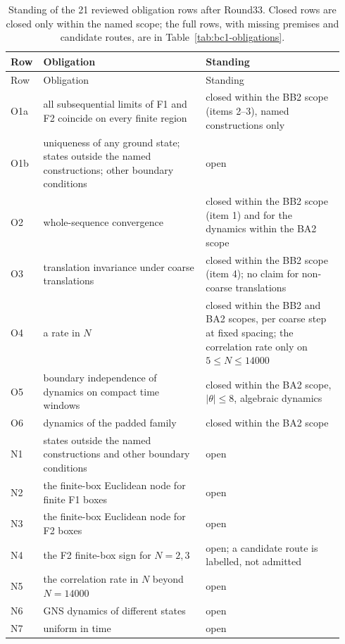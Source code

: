 \begingroup\small\setlength{\LTcapwidth}{\linewidth}
\begin{longtable}{@{}>{\raggedright\arraybackslash}p{0.07\linewidth}
 >{\raggedright\arraybackslash}p{0.47\linewidth}
 >{\raggedright\arraybackslash}p{0.40\linewidth}@{}}
\caption{Standing of the 21 reviewed obligation rows after Round33. Closed
rows are closed only within the named scope; the full rows, with missing
premises and candidate routes, are in Table~\ref{tab:bc1-obligations}.}
\label{tab:limits-obligations}\\
\toprule
Row & Obligation & Standing\\
\midrule
\endfirsthead
\toprule
Row & Obligation & Standing\\
\midrule
\endhead
\bottomrule
\endlastfoot
O1a & all subsequential limits of F1 and F2 coincide on every finite region & closed within the BB2 scope (items 2--3), named constructions only\\
O1b & uniqueness of any ground state; states outside the named constructions; other boundary conditions & open\\
O2 & whole-sequence convergence & closed within the BB2 scope (item 1) and for the dynamics within the BA2 scope\\
O3 & translation invariance under coarse translations & closed within the BB2 scope (item 4); no claim for non-coarse translations\\
O4 & a rate in $N$ & closed within the BB2 and BA2 scopes, per coarse step at fixed spacing; the correlation rate only on $5\le N\le14000$\\
O5 & boundary independence of dynamics on compact time windows & closed within the BA2 scope, $|\theta|\le8$, algebraic dynamics\\
O6 & dynamics of the padded family & closed within the BA2 scope\\
N1 & states outside the named constructions and other boundary conditions & open\\
N2 & the finite-box Euclidean node for finite F1 boxes & open\\
N3 & the finite-box Euclidean node for F2 boxes & open\\
N4 & the F2 finite-box sign for $N=2,3$ & open; a candidate route is labelled, not admitted\\
N5 & the correlation rate in $N$ beyond $N=14000$ & open\\
N6 & GNS dynamics of different states & open\\
N7 & uniform in time & open\\

\end{longtable}
